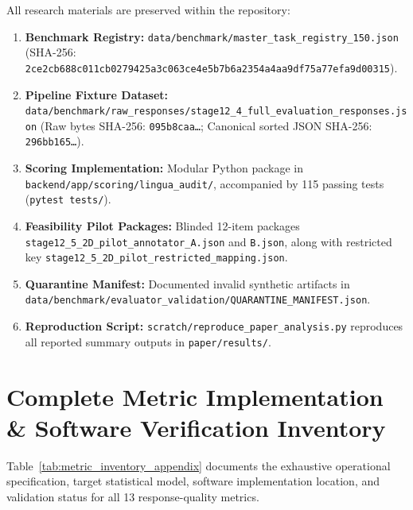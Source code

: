 \documentclass[11pt,a4paper]{article}
\begin{document}
All research materials are preserved within the repository:
\begin{enumerate}
  \item \textbf{Benchmark Registry:} \texttt{data/benchmark/master\_task\_registry\_150.json} (SHA-256: \texttt{2ce2cb688c011cb0279425a3c063ce4e5b7b6a2354a4aa9df75a77efa9d00315}).
  \item \textbf{Pipeline Fixture Dataset:} \texttt{data/benchmark/raw\_responses/stage12\_4\_full\_evaluation\_responses.json} (Raw bytes SHA-256: \texttt{095b8caa\dots}; Canonical sorted JSON SHA-256: \texttt{296bb165\dots}).
  \item \textbf{Scoring Implementation:} Modular Python package in \texttt{backend/app/scoring/lingua\_audit/}, accompanied by 115 passing tests (\texttt{pytest tests/}).
  \item \textbf{Feasibility Pilot Packages:} Blinded 12-item packages \texttt{stage12\_5\_2D\_pilot\_annotator\_A.json} and \texttt{B.json}, along with restricted key \texttt{stage12\_5\_2D\_pilot\_restricted\_mapping.json}.
  \item \textbf{Quarantine Manifest:} Documented invalid synthetic artifacts in \texttt{data/benchmark/evaluator\_validation/QUARANTINE\_MANIFEST.json}.
  \item \textbf{Reproduction Script:} \texttt{scratch/reproduce\_paper\_analysis.py} reproduces all reported summary outputs in \texttt{paper/results/}.
\end{enumerate}




\appendix
\section{Complete Metric Implementation \& Software Verification Inventory}
\label{sec:appendix_metrics}

Table~\ref{tab:metric_inventory_appendix} documents the exhaustive operational specification, target statistical model, software implementation location, and validation status for all 13 response-quality metrics.
\end{document}
